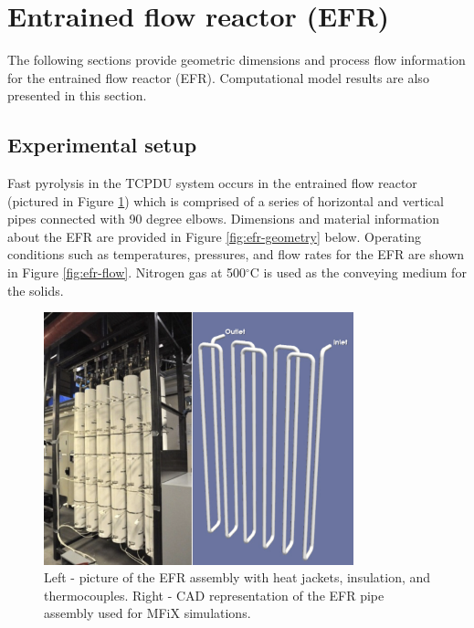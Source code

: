 
\section{Entrained flow reactor (EFR)}

The following sections provide geometric dimensions and process flow information for the entrained flow reactor (EFR). Computational model results are also presented in this section.

\subsection{Experimental setup}

Fast pyrolysis in the TCPDU system occurs in the entrained flow reactor (pictured in Figure \ref{fig:efr-assembly}) which is comprised of a series of horizontal and vertical pipes connected with 90 degree elbows. Dimensions and material information about the EFR are provided in Figure \ref{fig:efr-geometry} below. Operating conditions such as temperatures, pressures, and flow rates for the EFR are shown in Figure \ref{fig:efr-flow}. Nitrogen gas at 500$^{\circ}$C is used as the conveying medium for the solids.

\begin{figure}[!ht]
	\centering
	\includegraphics[width=0.8\textwidth]{figures/efr-assembly.png}
	\caption{Left - picture of the EFR assembly with heat jackets, insulation, and thermocouples. Right - CAD representation of the EFR pipe assembly used for MFiX simulations.}
	\label{fig:efr-assembly}
\end{figure}


